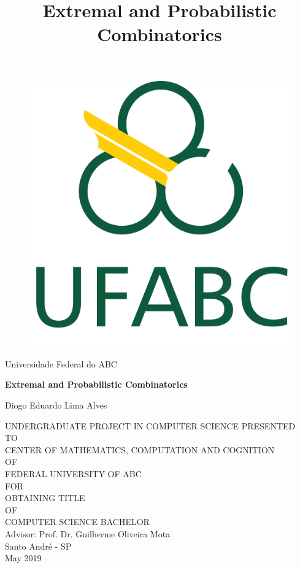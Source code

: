 \documentclass[12pt,twoside,a4paper,bibliography=totocnumbered]{book}
\numberwithin{equation}{section}
\theoremstyle{remark}
\begin{document}

\title{Extremal and Probabilistic Combinatorics}

      \begin{figure}[h!]%
        \centering%
        \includegraphics[scale=0.2]{Figuras/logo.png}%
      \end{figure}%
\begin{center}
Universidade Federal do ABC\\

\vspace{2cm}

{
\fontsize{18pt}{\baselineskip}\selectfont \bf
Extremal and Probabilistic Combinatorics
}

\vspace{2cm}

Diogo Eduardo Lima Alves\\

\vspace{2cm}

UNDERGRADUATE PROJECT IN COMPUTER SCIENCE PRESENTED\\
TO\\
CENTER OF MATHEMATICS, COMPUTATION AND COGNITION\\
OF\\
FEDERAL UNIVERSITY OF ABC\\
FOR\\
OBTAINING TITLE\\
OF\\
COMPUTER SCIENCE BACHELOR\\
\vspace{2cm}
Advisor: Prof. Dr. Guilherme Oliveira Mota\\
\vfill
Santo André - SP\\
May 2019
\end{center}
\end{document}

